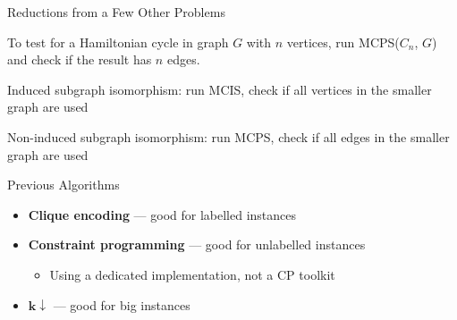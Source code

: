 \documentclass{beamer}
\begin{document}
\begin{frame}{Reductions from a Few Other Problems}
\begin{center}
\end{center}
    \begin{itemize}
       {
        \item To test for a Hamiltonian cycle in graph $G$ with $n$ vertices,
            run MCPS($C_n$, $G$) and check if the result has $n$ edges.
      }
       {
        \item Induced subgraph isomorphism: run MCIS, check if all vertices in the smaller graph are used
      }
       {
        \item Non-induced subgraph isomorphism: run MCPS, check if all edges in the smaller graph are used
      }
    \end{itemize}
\end{frame}

\begin{frame}{Previous Algorithms}
    \begin{itemize}
        \item \textbf{Clique encoding} --- good for labelled instances
        \item \textbf{Constraint programming} --- good for unlabelled instances
            \begin{itemize}
                \item Using a dedicated implementation, not a CP toolkit
            \end{itemize}
        \item $\mathbf{k{\downarrow}}$ --- good for big instances
    \end{itemize}
\end{frame}
\end{document}
